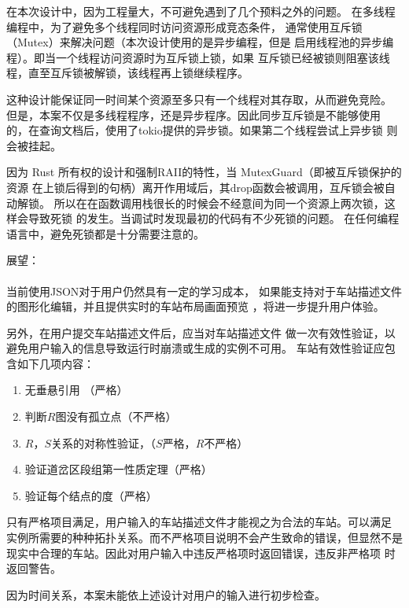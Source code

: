 \begin{keturon}
    在本次设计中，因为工程量大，不可避免遇到了几个预料之外的问题。
    在多线程编程中，为了避免多个线程同时访问资源形成竞态条件，
    通常使用互斥锁（Mutex）来解决问题（本次设计使用的是异步编程，但是
    启用线程池的异步编程）。即当一个线程访问资源时为互斥锁上锁，如果
    互斥锁已经被锁则阻塞该线程，直至互斥锁被解锁，该线程再上锁继续程序。

    这种设计能保证同一时间某个资源至多只有一个线程对其存取，从而避免竞险。
    但是，本案不仅是多线程程序，还是异步程序。因此同步互斥锁是不能够使用
    的，在查询文档后，使用了tokio提供的异步锁。如果第二个线程尝试上异步锁
    则会被挂起。

    因为 Rust 所有权的设计和强制RAII的特性，当 MutexGuard（即被互斥锁保护的资源
    在上锁后得到的句柄）离开作用域后，其drop函数会被调用，互斥锁会被自动解锁。
    所以在在函数调用栈很长的时候会不经意间为同一个资源上两次锁，这样会导致死锁
    的发生。当调试时发现最初的代码有不少死锁的问题。
    在任何编程语言中，避免死锁都是十分需要注意的。

    展望：

    \paragraph{} 当前使用JSON对于用户仍然具有一定的学习成本，
    如果能支持对于车站描述文件的图形化编辑，并且提供实时的车站布局画面预览
    ，将进一步提升用户体验。
    
    另外，在用户提交车站描述文件后，应当对车站描述文件
    做一次有效性验证，以避免用户输入的信息导致运行时崩溃或生成的实例不可用。
    车站有效性验证应包含如下几项内容：
    \begin{enumerate}[\indent i.]
        \item 无垂悬引用 （严格）
        \item 判断$R$图没有孤立点（不严格）
        \item $R$，$S$关系的对称性验证，（$S$严格，$R$不严格）
        \item 验证道岔区段组第一性质定理（严格）
        \item 验证每个结点的度（严格）
    \end{enumerate}
    只有严格项目满足，用户输入的车站描述文件才能视之为合法的车站。可以满足
    实例所需要的种种拓扑关系。而不严格项目说明不会产生致命的错误，但显然不是
    现实中合理的车站。因此对用户输入中违反严格项时返回错误，违反非严格项
    时返回警告。

    因为时间关系，本案未能依上述设计对用户的输入进行初步检查。



\end{keturon}
